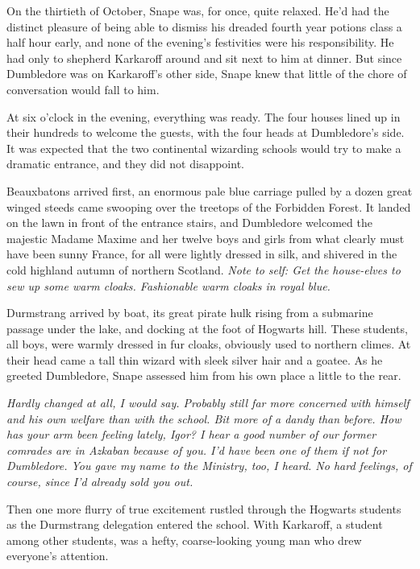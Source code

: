 On the thirtieth of October, Snape was, for once, quite relaxed. He'd had the distinct pleasure of being able to dismiss his dreaded fourth year potions class a half hour early, and none of the evening's festivities were his responsibility. He had only to shepherd Karkaroff around and sit next to him at dinner. But since Dumbledore was on Karkaroff's other side, Snape knew that little of the chore of conversation would fall to him.

At six o'clock in the evening, everything was ready. The four houses lined up in their hundreds to welcome the guests, with the four heads at Dumbledore's side. It was expected that the two continental wizarding schools would try to make a dramatic entrance, and they did not disappoint.

Beauxbatons arrived first, an enormous pale blue carriage pulled by a dozen great winged steeds came swooping over the treetops of the Forbidden Forest. It landed on the lawn in front of the entrance stairs, and Dumbledore welcomed the majestic Madame Maxime and her twelve boys and girls from what clearly must have been sunny France, for all were lightly dressed in silk, and shivered in the cold highland autumn of northern Scotland. \emph{Note to self: Get the house-elves to sew up some warm cloaks. Fashionable warm cloaks in{\el} royal blue.}

Durmstrang arrived by boat, its great pirate hulk rising from a submarine passage under the lake, and docking at the foot of Hogwarts hill. These students, all boys, were warmly dressed in fur cloaks, obviously used to northern climes. At their head came a tall thin wizard with sleek silver hair and a goatee. As he greeted Dumbledore, Snape assessed him from his own place a little to the rear.

\emph{Hardly changed at all, I would say. Probably still far more concerned with himself and his own welfare than with the school. Bit more of a dandy than before. How has your arm been feeling lately, Igor? I hear a good number of our former comrades are in Azkaban because of you. I'd have been one of them if not for Dumbledore. You gave my name to the Ministry, too, I heard. No hard feelings, of course, since I'd already sold you out.}

Then one more flurry of true excitement rustled through the Hogwarts students as the Durmstrang delegation entered the school. With Karkaroff, a student among other students, was a hefty, coarse-looking young man who drew everyone's attention.

